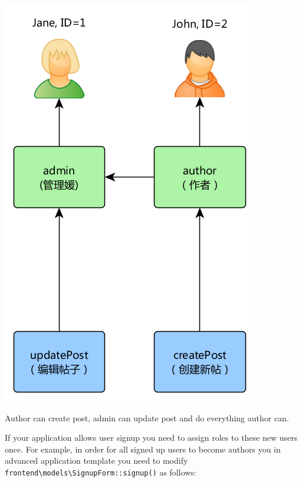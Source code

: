 \noindent\includegraphics[width=\textwidth]{images/rbac-hierarchy-1.png}

Author can create post, admin can update post and do everything author can.

If your application allows user signup you need to assign roles to these new users once. For example, in order for all
signed up users to become authors you in advanced application template you need to modify \lstinline|frontend\models\SignupForm::signup()|
as follows:


